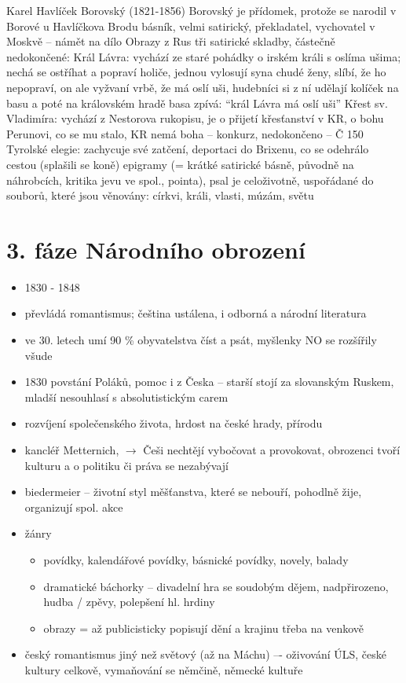 \documentclass{article}
\begin{document}
Karel Havlíček Borovský (1821-1856)
Borovský je přídomek, protože se narodil v Borové u Havlíčkova Brodu
básník, velmi satirický, překladatel, vychovatel v Moskvě -- námět na dílo Obrazy z Rus
tři satirické skladby, částečně nedokončené:
Král Lávra: vychází ze staré pohádky o irském králi s oslíma ušima; nechá se ostříhat a popraví holiče, jednou vylosují syna chudé ženy, slíbí, že ho nepopraví, on ale vyžvaní vrbě, že má oslí uši, hudebníci si z ní udělají kolíček na basu a poté na královském hradě basa zpívá: “král Lávra má oslí uši”
Křest sv. Vladimíra: vychází z Nestorova rukopisu, je o přijetí křesťanství v KR, o bohu Perunovi, co se mu stalo, KR nemá boha -- konkurz, nedokončeno -- Č 150
Tyrolské elegie: zachycuje své zatčení, deportaci do Brixenu, co se odehrálo cestou (splašili se koně)
epigramy (= krátké satirické básně, původně na náhrobcích, kritika jevu ve spol., pointa), psal je celoživotně, uspořádané do souborů, které jsou věnovány: církvi, králi, vlasti, múzám, světu









\part{3. fáze Národního obrození}
\begin{itemize}
  \item 1830 - 1848
  \item převládá romantismus; čeština ustálena, i odborná a národní literatura
  \item ve 30. letech umí 90 \% obyvatelstva číst a psát, myšlenky NO se rozšířily všude
  \item 1830 povstání Poláků, pomoc i z Česka -- starší stojí za slovanským Ruskem, mladší nesouhlasí s absolutistickým carem
  \item rozvíjení společenského života, hrdost na české hrady, přírodu
  \item kancléř Metternich,  $\rightarrow$ Češi nechtějí vybočovat a provokovat, obrozenci tvoří kulturu a o politiku či práva se nezabývají
  \item biedermeier -- životní styl měšťanstva, které se nebouří, pohodlně žije, organizují spol. akce
  \item žánry
  \begin{itemize}
    \item povídky, kalendářové povídky, básnické povídky, novely, balady
    \item dramatické báchorky -- divadelní hra se soudobým dějem, nadpřirozeno, hudba / zpěvy, polepšení hl. hrdiny
    \item obrazy = až publicisticky popisují dění a krajinu třeba na venkově
  \end{itemize}
  \item český romantismus jiný než světový (až na Máchu) –- oživování ÚLS, české kultury celkově, vymaňování se němčině, německé kultuře
\end{itemize}
\end{document}
